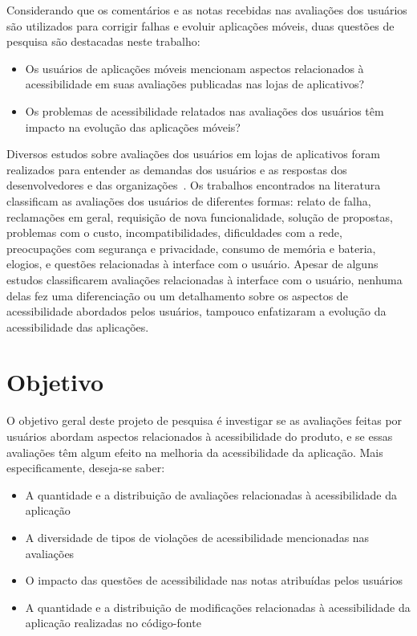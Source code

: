 Considerando que os comentários e as notas recebidas nas avaliações dos usuários são utilizados para corrigir falhas e evoluir aplicações móveis, duas questões de pesquisa são destacadas neste trabalho:
\begin{itemize}
 \item Os usuários de aplicações móveis mencionam aspectos relacionados à acessibilidade em suas avaliações publicadas nas lojas de aplicativos?
 \item Os problemas de acessibilidade relatados nas avaliações dos usuários têm impacto na evolução das aplicações móveis?
\end{itemize}

Diversos estudos sobre avaliações dos usuários em lojas de aplicativos foram realizados para entender as demandas dos usuários e as respostas dos desenvolvedores e das organizações~\cite{Iacob2013retrieving,Pagano2013userfeedback,Iacob2014online,Mcilroy2016analyzing,Sorbo2017surf,Ciurumelea2017analyzing,Ortega2015thesis,Li2018MobileAE,Pelloni2018becloma,Panichella2015how}. Os trabalhos encontrados na literatura classificam as avaliações dos usuários de diferentes formas: 
relato de falha, reclamações em geral, requisição de nova funcionalidade, solução de propostas, problemas com o custo, incompatibilidades, dificuldades com a rede, preocupações com segurança e privacidade, consumo de memória e bateria, elogios, e questões relacionadas à interface com o usuário.
Apesar de alguns estudos classificarem avaliações relacionadas à interface com o usuário, nenhuma delas fez uma diferenciação ou um detalhamento sobre os aspectos de acessibilidade abordados pelos usuários, tampouco enfatizaram a evolução da acessibilidade das aplicações. 


\section{Objetivo} 

O objetivo geral deste projeto de pesquisa é investigar se as avaliações feitas por usuários abordam aspectos relacionados à acessibilidade do produto, e se essas avaliações têm algum efeito na melhoria da acessibilidade da aplicação. Mais especificamente, deseja-se saber:
\begin{itemize}
 \item A quantidade e a distribuição de avaliações relacionadas à acessibilidade da aplicação
 \item A diversidade de tipos de violações de acessibilidade mencionadas nas avaliações
 \item O impacto das questões de acessibilidade nas notas atribuídas pelos usuários
 \item A quantidade e a distribuição de modificações relacionadas à acessibilidade da aplicação realizadas no código-fonte
\end{itemize}



